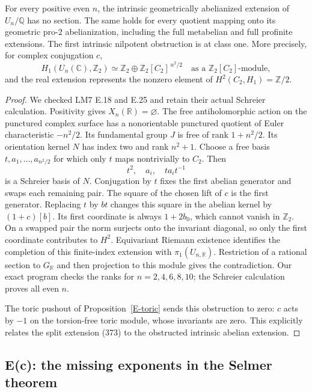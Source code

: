 \begin{proposition}
\label{E-even}
For every positive even $n$, the intrinsic geometrically
abelianized extension of $U_n/\mathbb Q$ has no section.
The same holds for every quotient mapping onto its
geometric pro-$2$ abelianization, including the full
metabelian and full profinite extensions. The first
intrinsic nilpotent obstruction is at class one.
More precisely, for complex conjugation $c$,
\[
 H_1(U_n(\mathbb C),\mathbb Z_2)
 \simeq\mathbb Z_2\oplus
       \mathbb Z_2[C_2]^{\,n^2/2}
 \quad\text{as a }\mathbb Z_2[C_2]\text{-module},
\]
and the real extension represents the nonzero element
of $H^2(C_2,H_1)=\mathbb Z/2$.
\end{proposition}
\begin{proof}
We checked LM7 E.18 and E.25 and retain their actual
Schreier calculation. Positivity gives $X_n(\mathbb R)=\varnothing$.
The free antiholomorphic action on the punctured complex
surface has a nonorientable punctured quotient of Euler
characteristic $-n^2/2$. Its fundamental group $J$ is
free of rank $1+n^2/2$. Its orientation kernel $N$
has index two and rank $n^2+1$. Choose a free basis
$t,a_1,\dots,a_{n^2/2}$ for which only $t$ maps
nontrivially to $C_2$. Then
\[
 t^2,\quad a_i,\quad t a_i t^{-1}
\]
is a Schreier basis of $N$. Conjugation by $t$ fixes
the first abelian generator and swaps each remaining
pair. The square of the chosen lift of $c$ is the
first generator. Replacing $t$ by $bt$ changes this
square in the abelian kernel by $(1+c)[b]$.
Its first coordinate is always $1+2b_0$, which cannot
vanish in $\mathbb Z_2$. On a swapped pair the norm
surjects onto the invariant diagonal, so only the
first coordinate contributes to $H^2$.
Equivariant Riemann existence identifies the completion
of this finite-index extension with $\pi_1(U_{n,\mathbb R})$.
Restriction of a rational section to $G_{\mathbb R}$
and then projection to this module gives the contradiction.
Our exact program checks the ranks for $n=2,4,6,8,10$;
the Schreier calculation proves all even $n$.

The toric pushout of Proposition~\ref{E-toric} sends
this obstruction to zero: $c$ acts by $-1$ on the
torsion-free toric module, whose invariants are zero.
This explicitly relates the split extension (373)
to the obstructed intrinsic abelian extension.
\end{proof}

\subsection{E(c): the missing exponents in the Selmer theorem}

